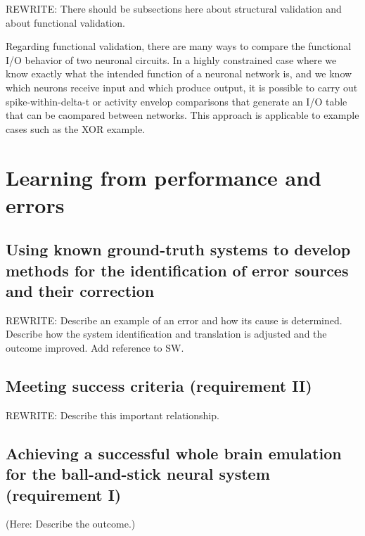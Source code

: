 \documentclass{ldr-article}
\begin{document}
\alert{REWRITE: } There should be subsections here about structural validation and about functional validation.

Regarding functional validation, there are many ways to compare the functional I/O behavior of two neuronal circuits. In a highly constrained case where we know exactly what the intended function of a neuronal network is,
and we know which neurons receive input and which produce output, it is possible to carry out spike-within-delta-t or activity envelop comparisons that generate an I/O table that can be caompared between networks.
This approach is applicable to example cases such as the XOR example.


\section{Learning from performance and errors}

\subsection{Using known ground-truth systems to develop methods for the identification of error sources and their correction}

\alert{REWRITE:} Describe an example of an error and how its cause is determined. Describe how the system identification and translation is adjusted and the outcome improved. Add reference to SW.

\subsection{Meeting success criteria (requirement II)}

\alert{REWRITE:} Describe this important relationship.

\subsection{Achieving a successful whole brain emulation for the ball-and-stick neural system (requirement I)}

(Here: Describe the outcome.)

\end{document}
